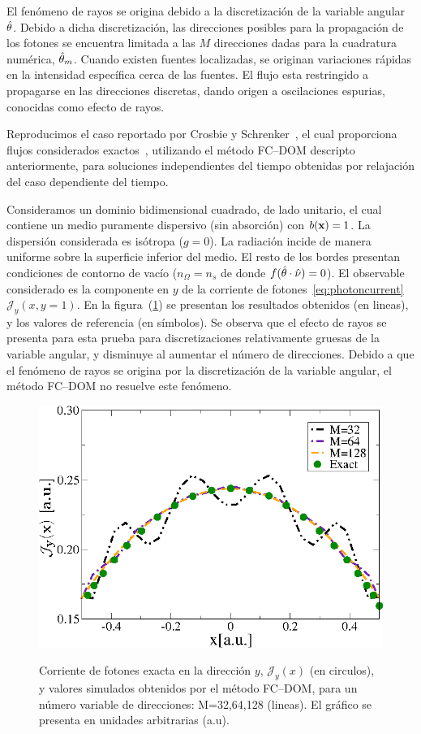 El fenómeno de rayos se origina debido a la discretización 
de la variable angular $\hat{\theta}$. Debido a dicha discretización, 
las direcciones posibles para la propagación de los fotones 
se encuentra limitada a las $M$ direcciones dadas para la cuadratura 
numérica, $\hat{\theta}_m$. Cuando existen fuentes localizadas, 
se originan variaciones rápidas en la intensidad específica 
cerca de las fuentes. El flujo esta restringido a propagarse 
en las direcciones discretas, dando origen a oscilaciones 
espurias, conocidas como efecto de rayos. 

Reproducimos el caso reportado por Crosbie y Schrenker~\cite{Crosbie1984}, 
el cual proporciona flujos considerados exactos~\cite{Ramankutty1997,tagnekamdem2015}, 
utilizando el método FC--DOM descripto anteriormente, para soluciones independientes 
del tiempo obtenidas por relajación del caso dependiente del tiempo. 

Consideramos un dominio bidimensional cuadrado, de lado unitario, 
el cual contiene un medio puramente dispersivo (sin absorción) 
con $b(\mathbf{x})=1$. La dispersión considerada es isótropa ($g=0$). 
La radiación incide de manera uniforme sobre la superficie inferior del medio. 
El resto de los bordes presentan condiciones de contorno de vacío ($n_{\Omega}=n_{s}$ 
de donde $f(\hat{\theta} \cdot \hat{\nu})=0$). El observable considerado es la componente en $y$ de la corriente de fotones~\eqref{eq:photoncurrent} $\mathcal{J}_y(x,y=1)$. En la figura~(\ref{fig:fluxph3}) 
se presentan los resultados obtenidos (en lineas), y los valores de referencia (en símbolos). 
Se observa que el efecto de rayos se presenta para esta prueba para discretizaciones 
relativamente gruesas de la variable angular, y disminuye al aumentar 
el número de direcciones. Debido a que el fenómeno de rayos se origina 
por la discretización de la variable angular, el método FC--DOM 
no resuelve este fenómeno. 
\begin{figure}[h!]
\centering
  \includegraphics[width=0.48\linewidth]{figuras/raycurrent.eps}\\
  \caption{
Corriente de fotones exacta en la dirección $y$, $\mathcal{J}_y(x)$ (en circulos), 
y valores simulados obtenidos por el método FC--DOM, 
para un número variable de direcciones: M=32,64,128 (lineas). El gráfico 
se presenta en unidades arbitrarias (a.u).}
 \label{fig:fluxph3}
\end{figure}

